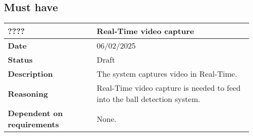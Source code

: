 \documentclass{article}
\begin{document}
\subsection{Must have}

\begin{table}[H]
    \renewcommand{\arraystretch}{1.3}
    \begin{tabular}{|l|p{10cm}|}
        \hline
        \rowcolor{gray!50}
        \textbf{????} & \textbf{Real-Time video capture} \\ \hline
        \textbf{Date} & 06/02/2025 \\ \hline
        \textbf{Status} & Draft \\ \hline
        \textbf{Description} & The system captures video in Real-Time. \\ \hline
        \textbf{Reasoning} & Real-Time video capture is needed to feed into the ball detection system. \\ \hline
        \textbf{Dependent on requirements} & None. \\ \hline
    \end{tabular}
\end{table}
\end{document}
